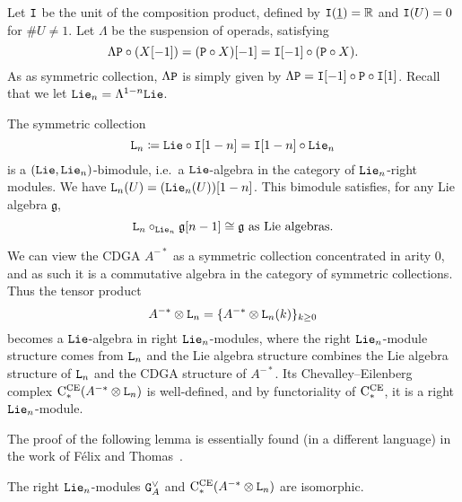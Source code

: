 Let $\mathtt{I}$ be the unit of the composition product, defined by $\mathtt{I}(\underline{1}) = \mathbb{R}$ and $\mathtt{I}(U) = 0$ for $\# U \neq 1$.
Let $\Lambda$ be the suspension of operads, satisfying
\[ \Lambda \mathtt{P} \circ (X [-1]) = (\mathtt{P} \circ X) [-1] = \mathtt{I}[-1] \circ (\mathtt{P} \circ X). \]
As as symmetric collection, $\Lambda \mathtt{P}$ is simply given by $\Lambda \mathtt{P} = \mathtt{I}[-1] \circ \mathtt{P} \circ \mathtt{I}[1]$.
Recall that we let $\mathtt{Lie}_{n} = \Lambda^{1-n} \mathtt{Lie}$.

The symmetric collection
\begin{equation}
  \label{cnf.eq:20}
  \mathtt{L}_{n} \coloneqq \mathtt{Lie} \circ \mathtt{I}[1-n] = \mathtt{I}[1-n] \circ \mathtt{Lie}_{n}
\end{equation}
is a $(\mathtt{Lie}, \mathtt{Lie}_{n})$-bimodule, i.e.\ a $\mathtt{Lie}$-algebra in the category of $\mathtt{Lie}_{n}$-right modules.
We have $\mathtt{L}_{n}(U) = (\mathtt{Lie}_{n}(U))[1-n]$.
This bimodule satisfies, for any Lie algebra $\mathfrak{g}$,
\begin{equation}
  \label{cnf.eq:19}
  \mathtt{L}_{n} \circ_{\mathtt{Lie}_{n}} \mathfrak{g}[n-1] \cong \mathfrak{g} \text{ as Lie algebras.}
\end{equation}

We can view the CDGA $A^{-*}$ as a symmetric collection concentrated in arity $0$, and as such it is a commutative algebra in the category of symmetric collections.
Thus the tensor product
\[ A^{-*} \otimes \mathtt{L}_{n} = \{ A^{-*} \otimes \mathtt{L}_{n}(k) \}_{k \geq 0} \]
becomes a $\mathtt{Lie}$-algebra in right $\mathtt{Lie}_{n}$-modules, where the right $\mathtt{Lie}_{n}$-module structure comes from $\mathtt{L}_{n}$ and the Lie algebra structure combines the Lie algebra structure of $\mathtt{L}_{n}$ and the CDGA structure of $A^{-*}$.
Its Chevalley--Eilenberg complex $\mathrm{C}_{*}^{\mathrm{CE}}(A^{-*} \otimes \mathtt{L}_{n})$ is well-defined, and by functoriality of $\mathrm{C}_{*}^{\mathrm{CE}}$, it is a right $\mathtt{Lie}_{n}$-module.

The proof of the following lemma is essentially found (in a different language) in the work of Félix and Thomas~\cite[Section 2]{FelixThomas2004}.

\begin{lemma}
  \label{cnf.lemma.cmp-felix-thomas}
  The right $\mathtt{Lie}_{n}$-modules $\mathtt{G}_{A}^{\vee}$ and $\mathrm{C}_{*}^{\mathrm{CE}}(A^{-*} \otimes \mathtt{L}_{n})$ are isomorphic.
\end{lemma}


